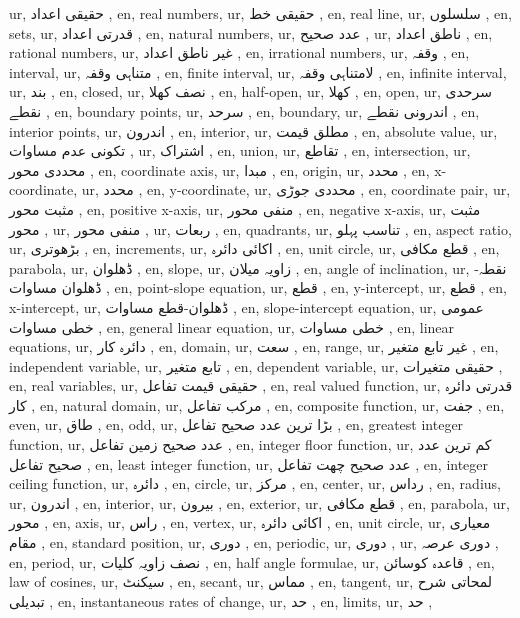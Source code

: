 ur, حقیقی اعداد ,
en, real numbers,
ur, حقیقی خط ,
en, real line,
ur, سلسلوں ,
en, sets,
ur, قدرتی اعداد ,
en, natural numbers,
ur, عدد صحیح ,
ur, ناطق اعداد ,
en, rational numbers,
ur, غیر ناطق اعداد ,
en, irrational numbers,
ur, وقفہ ,
en, interval,
ur, متناہی وقفہ ,
en, finite interval,
ur, لامتناہی وقفہ ,
en, infinite interval,
ur, بند ,
en, closed,
ur, نصف کھلا ,
en, half-open,
ur, کھلا ,
en, open,
ur, سرحدی نقطے ,
en, boundary points,
ur, سرحد ,
en, boundary,
ur, اندرونی نقطے ,
en, interior points,
ur, اندرون ,
en, interior,
ur, مطلق قیمت ,
en, absolute value,
ur, تکونی عدم مساوات ,
ur, اشتراک ,
en, union,
ur, تقاطع ,
en, intersection,
ur, محددی محور ,
en, coordinate axis,
ur, مبدا ,
en, origin,
ur,  محدد ,
en, x-coordinate,
ur,  محدد ,
en, y-coordinate,
ur, محددی جوڑی ,
en, coordinate pair,
ur, مثبت  محور ,
en, positive x-axis,
ur, منفی  محور ,
en, negative x-axis,
ur, مثبت  محور ,
ur, منفی  محور ,
ur, ربعات ,
en, quadrants,
ur, تناسب پہلو ,
en, aspect ratio,
ur, بڑھوتری ,
en, increments,
ur, اکائی دائرہ ,
en, unit circle,
ur, قطع مکافی ,
en, parabola,
ur, ڈھلوان ,
en, slope,
ur, زاویہ میلان ,
en, angle of inclination,
ur, نقطہ-ڈھلوان مساوات ,
en, point-slope equation,
ur,  قطع ,
en, y-intercept,
ur,  قطع ,
en, x-intercept,
ur, ڈھلوان-قطع مساوات ,
en, slope-intercept equation,
ur, عمومی خطی مساوات ,
en, general linear equation,
ur, خطی مساوات ,
en, linear equations,
ur, دائرہ کار ,
en, domain,
ur, سعت ,
en, range,
ur, غیر تابع متغیر ,
en, independent variable,
ur, تابع متغیر ,
en, dependent variable,
ur, حقیقی متغیرات ,
en, real variables,
ur, حقیقی قیمت تفاعل ,
en, real valued function,
ur, قدرتی دائرہ کار ,
en, natural domain,
ur, مرکب تفاعل ,
en, composite function,
ur, جفت ,
en, even,
ur, طاق ,
en, odd,
ur, بڑا ترین عدد صحیح تفاعل ,
en, greatest integer function,
ur, عدد صحیح زمین تفاعل ,
en, integer floor function,
ur, کم ترین عدد صحیح تفاعل ,
en, least integer function,
ur, عدد صحیح چھت تفاعل ,
en, integer ceiling function,
ur, دائرہ ,
en, circle,
ur, مرکز ,
en, center,
ur, رداس ,
en, radius,
ur, اندرون ,
en, interior,
ur, بیرون ,
en, exterior,
ur, قطع مکافی ,
en, parabola,
ur, محور ,
en, axis,
ur, راس ,
en, vertex,
ur, اکائی دائرہ ,
en, unit circle,
ur, معیاری مقام ,
en, standard position,
ur, دوری ,
en, periodic,
ur, دوری ,
ur, دوری عرصہ ,
en, period,
ur, نصف زاویہ کلیات ,
en, half angle formulae,
ur, قاعدہ کوسائن ,
en, law of cosines,
ur, سیکنٹ ,
en, secant,
ur, مماس ,
en, tangent,
ur, لمحاتی شرح تبدیلی ,
en, instantaneous rates of change,
ur, حد ,
en, limits,
ur, حد ,
